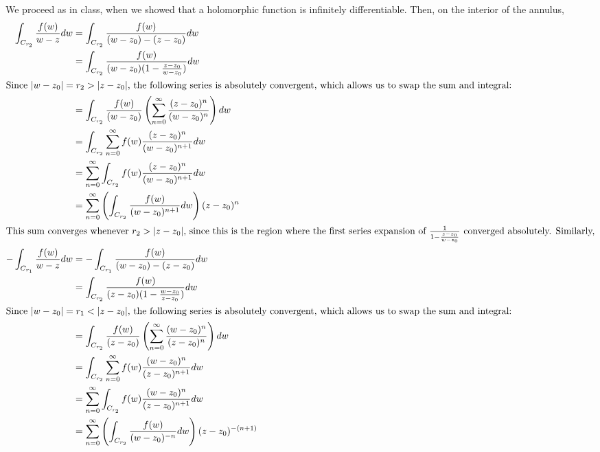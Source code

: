 \documentclass[12pt,letterpaper]{article}
\theoremstyle{definition}
\begin{document}
We proceed as in class, when we showed that a holomorphic function is infinitely differentiable. Then, on the interior of the annulus,
\begin{align*}
  \int_{C_{r_{2}}}\frac{f(w)}{w-z}dw &= \int_{C_{r_{2}}}\frac{f(w)}{(w-z_{0}) - (z-z_{0})}dw \\
               &= \int_{C_{r_{2}}}\frac{f(w)}{(w-z_{0})(1 - \frac{z-z_{0}}{w-z_{0}})}dw \\
  \intertext{Since $|w-z_{0}| = r_{2} > |z-z_{0}|$, the following series is absolutely convergent, which allows us to swap the sum and integral:}
                                       &= \int_{C_{r_{2}}}\frac{f(w)}{(w-z_{0})}\left(\sum_{n=0}^{\infty}\frac{(z-z_{0})^{n}}{(w-z_{0})^{n}}\right)dw \\
                                       &= \int_{C_{r_{2}}}\sum_{n=0}^{\infty}f(w)\frac{(z-z_{0})^{n}}{(w-z_{0})^{n+1}}dw \\
                                       &= \sum_{n=0}^{\infty}\int_{C_{r_{2}}}f(w)\frac{(z-z_{0})^{n}}{(w-z_{0})^{n+1}}dw \\
                                       &= \sum_{n=0}^{\infty}\left(\int_{C_{r_{2}}}\frac{f(w)}{(w-z_{0})^{n+1}}dw\right)(z-z_{0})^{n} \\
  \intertext{This sum converges whenever $r_{2} > |z - z_{0}|$, since this is the region where the first series expansion of $\frac{1}{1 - \frac{z-z_{0}}{w-z_{0}}}$ converged absolutely. Similarly,}
  -\int_{C_{r_{1}}}\frac{f(w)}{w-z}dw &= -\int_{C_{r_{1}}}\frac{f(w)}{(w-z_{0}) - (z-z_{0})}dw \\
               &= \int_{C_{r_{2}}}\frac{f(w)}{(z-z_{0})(1 - \frac{w-z_{0}}{z-z_{0}})}dw \\
  \intertext{Since $|w-z_{0}| = r_{1} < |z-z_{0}|$, the following series is absolutely convergent, which allows us to swap the sum and integral:}
                                       &= \int_{C_{r_{2}}}\frac{f(w)}{(z-z_{0})}\left(\sum_{n=0}^{\infty}\frac{(w-z_{0})^{n}}{(z-z_{0})^{n}}\right)dw \\
                                       &= \int_{C_{r_{2}}}\sum_{n=0}^{\infty}f(w)\frac{(w-z_{0})^{n}}{(z-z_{0})^{n+1}}dw \\
                                       &= \sum_{n=0}^{\infty}\int_{C_{r_{2}}}f(w)\frac{(w-z_{0})^{n}}{(z-z_{0})^{n+1}}dw \\
                                       &= \sum_{n=0}^{\infty}\left(\int_{C_{r_{2}}}\frac{f(w)}{(w-z_{0})^{-n}}dw\right)(z-z_{0})^{-(n+1)} \\

\end{align*}
\end{document}

